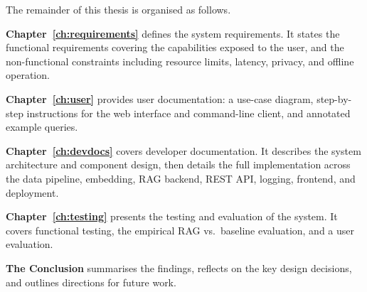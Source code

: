 The remainder of this thesis is organised as follows.

\textbf{Chapter~\ref{ch:requirements}} defines the system requirements. It states
the functional requirements covering the capabilities exposed to the user, and the
non-functional constraints including resource limits, latency, privacy, and offline
operation.

\textbf{Chapter~\ref{ch:user}} provides user documentation: a use-case diagram, step-by-step
instructions for the web interface and command-line client, and annotated example queries.

\textbf{Chapter~\ref{ch:devdocs}} covers developer documentation. It describes the system
architecture and component design, then details the full implementation across the data
pipeline, embedding, RAG backend, REST API, logging, frontend, and deployment.

\textbf{Chapter~\ref{ch:testing}} presents the testing and evaluation of the system. It covers
functional testing, the empirical RAG vs.\ baseline evaluation, and a user evaluation.

\textbf{The Conclusion} summarises the findings, reflects on the key design decisions, and
outlines directions for future work.